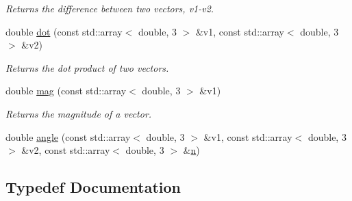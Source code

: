 \begin{DoxyCompactItemize}
\begin{DoxyCompactList}\small\item\em Returns the difference between two vectors, v1-\/v2. \end{DoxyCompactList}\item 
double \hyperlink{namespaceFManII_a804811720c4566ddd330e4abc8d2c65f}{dot} (const std\+::array$<$ double, 3 $>$ \&v1, const std\+::array$<$ double, 3 $>$ \&v2)\hypertarget{namespaceFManII_a804811720c4566ddd330e4abc8d2c65f}{}\label{namespaceFManII_a804811720c4566ddd330e4abc8d2c65f}

\begin{DoxyCompactList}\small\item\em Returns the dot product of two vectors. \end{DoxyCompactList}\item 
double \hyperlink{namespaceFManII_a88126c99fc2140b9a3c37d695337fd6a}{mag} (const std\+::array$<$ double, 3 $>$ \&v1)\hypertarget{namespaceFManII_a88126c99fc2140b9a3c37d695337fd6a}{}\label{namespaceFManII_a88126c99fc2140b9a3c37d695337fd6a}

\begin{DoxyCompactList}\small\item\em Returns the magnitude of a vector. \end{DoxyCompactList}\item 
double \hyperlink{namespaceFManII_a45ace6891d8e67f7e4b679300533e0ac}{angle} (const std\+::array$<$ double, 3 $>$ \&v1, const std\+::array$<$ double, 3 $>$ \&v2, const std\+::array$<$ double, 3 $>$ \&\hyperlink{namespaceFManII_ab331802fde4c5f2564443f1704c25363a351f38f2149aa0e3be56f7c5aa16eae9}{n})
\end{DoxyCompactItemize}


\subsection{Typedef Documentation}
